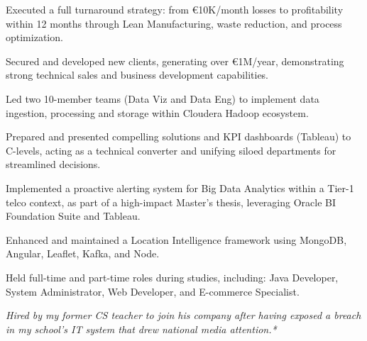 \documentclass[]{deedy-resume-cv}
\begin{document}
\begin{minipage}[t]{0.60\textwidth}
\begin{tightemize}
\item Executed a full turnaround strategy: from €10K/month losses to profitability within 12 months through Lean Manufacturing, waste reduction, and process optimization.
\end{tightemize}

\sectionsep
{}
\begin{tightemize}
\item Secured and developed new clients, generating over €1M/year, demonstrating strong technical sales and business development capabilities.

\item Led two 10-member teams (Data Viz and Data Eng) to implement data ingestion, processing and storage within Cloudera Hadoop ecosystem.

\item Prepared and presented compelling solutions and KPI dashboards (Tableau) to C-levels, acting as a technical converter and unifying siloed departments for streamlined decisions.
\end{tightemize}

\sectionsep
{}
\begin{tightemize}
\item Implemented a proactive alerting system for Big Data Analytics within a Tier-1 telco context, as part of a high-impact Master's thesis, leveraging Oracle BI Foundation Suite and Tableau.
\item Enhanced and maintained a Location Intelligence framework using MongoDB, Angular, Leaflet, Kafka, and Node. 
\end{tightemize}

\sectionsep
{}
Held full-time and part-time roles during studies, including: Java Developer, System Administrator, Web Developer, and E-commerce Specialist.

\sectionsep
{}
\small{\textit{Hired by my former CS teacher to join his company after having exposed a breach in my school's IT system that drew national media attention.*}}

%
%
\end{minipage}
\end{document}
